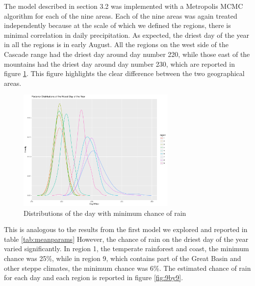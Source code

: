 \documentclass{article}
\begin{document}
The model described in section 3.2 was implemented with a Metropolis MCMC algorithm for each of the nine areas.  Each of the nine areas was again treated independently because at the scale of which we defined the regions, there is minimal correlation in daily precipitation.  As expected, the driest day of the year in all the regions is in early August. All the regions on the west side of the Cascade range had the driest day around day number 220, while those east of the mountains had the driest day around day number 230, which are reported in figure \ref{fig:driestDist}. This figure highlights the clear difference between the two geographical areas.
\begin{figure}
\centering
\includegraphics[width = .4\textwidth, height = 6cm]{NicestDayOfYear}
\caption{Distributions of the day with minimum chance of rain}
\label{fig:driestDist}
\end{figure}
This is analogous to the results from the first model we explored and reported in table \ref{tab:meanparams}
However, the chance of rain on the driest day of the year varied significantly. In region 1, the temperate rainforest and coast, the minimum chance was 25\%, while in region 9, which contains part of the Great Basin and other steppe climates, the minimum chance was 6\%. The estimated chance of rain for each day and each region is reported in figure \ref{fig:9by9}.
\end{document}
